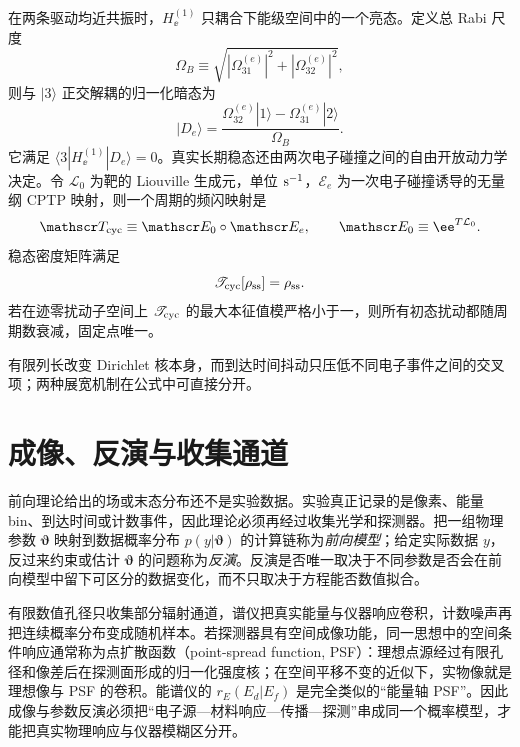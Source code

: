 在两条驱动均近共振时，$H_\ee^{(1)}$ 只耦合下能级空间中的一个亮态。定义总 Rabi 尺度
\begin{equation*}
\Omega_B
\equiv\sqrt{|\Omega_{31}^{(e)}|^2+|\Omega_{32}^{(e)}|^2},
\end{equation*}
则与 $|3\rangle$ 正交解耦的归一化暗态为
\begin{equation*}
|D_e\rangle
=\frac{\Omega_{32}^{(e)}|1\rangle
-\Omega_{31}^{(e)}|2\rangle}{\Omega_B}.
\end{equation*}
它满足 $\langle3|H_\ee^{(1)}|D_e\rangle=0$。真实长期稳态还由两次电子碰撞之间的自由开放动力学决定。令 $\mathcal L_0$ 为靶的 Liouville 生成元，单位 ${\rm s^{-1}}$，$\mathscr E_e$ 为一次电子碰撞诱导的无量纲 CPTP 映射，则一个周期的频闪映射是
\begin{equation*}
\mathscr T_{\rm cyc}
\equiv\mathscr E_0\circ\mathscr E_e,\qquad\mathscr E_0\equiv\ee^{T\mathcal L_0}.
\end{equation*}
稳态密度矩阵满足
\begin{equation*}
\mathscr T_{\rm cyc}[\rho_{\rm ss}]=\rho_{\rm ss}.
\end{equation*}
若在迹零扰动子空间上 $\mathscr T_{\rm cyc}$ 的最大本征值模严格小于一，则所有初态扰动都随周期数衰减，固定点唯一。

有限列长改变 Dirichlet 核本身，而到达时间抖动只压低不同电子事件之间的交叉项；两种展宽机制在公式中可直接分开。

\section{成像、反演与收集通道}

前向理论给出的场或末态分布还不是实验数据。实验真正记录的是像素、能量 bin、到达时间或计数事件，因此理论必须再经过收集光学和探测器。把一组物理参数 $\boldsymbol\vartheta$ 映射到数据概率分布 $p(y|\boldsymbol\vartheta)$ 的计算链称为\emph{前向模型}；给定实际数据 $y$，反过来约束或估计 $\boldsymbol\vartheta$ 的问题称为\emph{反演}。反演是否唯一取决于不同参数是否会在前向模型中留下可区分的数据变化，而不只取决于方程能否数值拟合。

有限数值孔径只收集部分辐射通道，谱仪把真实能量与仪器响应卷积，计数噪声再把连续概率分布变成随机样本。若探测器具有空间成像功能，同一思想中的空间条件响应通常称为点扩散函数（point-spread function, PSF）：理想点源经过有限孔径和像差后在探测面形成的归一化强度核；在空间平移不变的近似下，实物像就是理想像与 PSF 的卷积。能谱仪的 $r_E(E_d|E_f)$ 是完全类似的“能量轴 PSF”。因此成像与参数反演必须把“电子源—材料响应—传播—探测”串成同一个概率模型，才能把真实物理响应与仪器模糊区分开。

